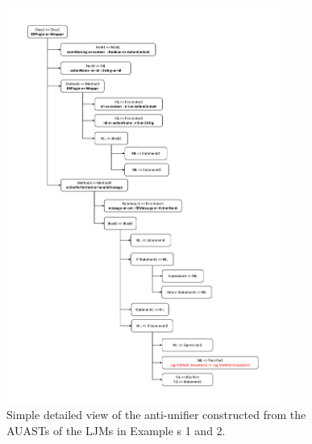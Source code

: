 \begin{figure} [H]
  \centering\includegraphics [width = 0.8\textwidth, height = 0.9\textheight]{Drawing4/anti-unifier.pdf}
  \caption{Simple detailed view of the anti-unifier constructed from the AUASTs of the LJMs in Example s 1 and 2.}
  \label{fig:meth-anti-unifier}
\end{figure}





